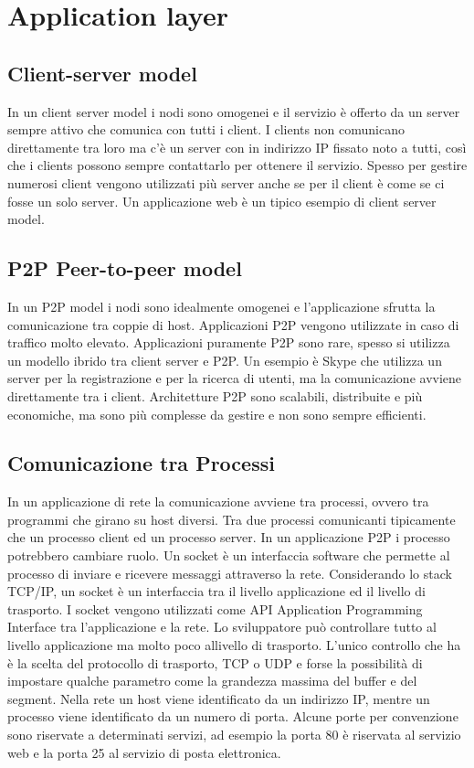 \documentclass[12pt]{article}
\begin{document}
\tableofcontents
\section{Application layer}
\subsection{Client-server model}
In un client server model i nodi sono omogenei e il servizio è offerto da un server sempre attivo che comunica con tutti i client. 
I clients non comunicano direttamente tra loro ma c'è un server con in indirizzo IP fissato noto a tutti, così che i clients possono sempre contattarlo per ottenere il servizio. 
Spesso per gestire numerosi client vengono utilizzati più server anche se per il client è come se ci fosse un solo server.
Un applicazione web è un tipico esempio di client server model.

\subsection{P2P Peer-to-peer model}
In un P2P model i nodi sono idealmente omogenei e l'applicazione sfrutta la comunicazione tra coppie di host.
Applicazioni P2P vengono utilizzate in caso di traffico molto elevato.
Applicazioni puramente P2P sono rare, spesso si utilizza un modello ibrido tra client server e P2P. 
Un esempio è Skype che utilizza un server per la registrazione e per la ricerca di utenti, ma la comunicazione avviene direttamente tra i client.
Architetture P2P sono scalabili, distribuite e più economiche, ma sono più complesse da gestire e non sono sempre efficienti.

\subsection{Comunicazione tra Processi}
In un applicazione di rete la comunicazione avviene tra processi, ovvero tra programmi che girano su host diversi. 
Tra due processi comunicanti tipicamente che un processo client ed un processo server.
In un applicazione P2P i processo potrebbero cambiare ruolo.
Un socket è un interfaccia software che permette al processo di inviare e ricevere messaggi attraverso la rete.
Considerando lo stack TCP/IP, un socket è un interfaccia tra il livello applicazione ed il livello di trasporto.
I socket vengono utilizzati come API Application Programming Interface tra l'applicazione e la rete.
Lo sviluppatore può controllare tutto al livello applicazione ma molto poco allivello di trasporto.
L'unico controllo che ha è la scelta del protocollo di trasporto, TCP o UDP e forse la possibilità di impostare qualche parametro come la grandezza massima del buffer e del segment.
Nella rete un host viene identificato da un indirizzo IP, mentre un processo viene identificato da un numero di porta.
Alcune porte per convenzione sono riservate a determinati servizi, ad esempio la porta 80 è riservata al servizio web e la porta 25 al servizio di posta elettronica.
\end{document}
